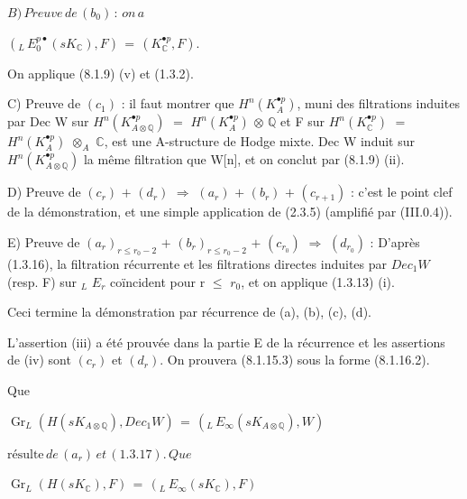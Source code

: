 \documentclass[11pt,twoside]{article}
\newcommand{\DFormula}[1]{%
  \par\smallskip\noindent\hspace*{0pt}\(\displaystyle #1\)\par\smallskip
}
\begin{document}
\DFormula{B)\,Preuve\,de\,(b_{0})\,:\,on\,a}
\par\medskip
\DFormula{(_{L}\,E_{0}^{p\bullet }(sK_{\mathbb{C}}),F)\,=\,(K_{\mathbb{C}}^{\bullet p},F).}
\par\medskip
On applique (8.1.9) (v) et (1.3.2).\par
\par\medskip
C) Preuve de \((c_{1})\) : il faut montrer que \(H^{n}(K_{A}^{\bullet p})\), muni des filtrations induites par Dec W sur \(H^{n}(K_{A\otimes \mathbb{Q}}^{\bullet p})\) \(=\) \(H^{n}(K_{A}^{\bullet p})\) \(\otimes \) \(\mathbb{Q}\) et F sur \(H^{n}(K_{\mathbb{C}}^{\bullet p})\) \(=\) \(H^{n}(K_{A}^{\bullet p})\) \(\otimes _{A}\) \(\mathbb{C}\), est une A-structure de Hodge mixte. Dec W induit sur \(H^{n}(K_{A\otimes \mathbb{Q}}^{\bullet p})\) la même filtration que W[n], et on conclut par (8.1.9) (ii).\par
\par\medskip
D) Preuve de \((c_{r})\) \(+\) \((d_{r})\) \(\Rightarrow \) \((a_{r})\) \(+\) \((b_{r})\) \(+\) \((c_{r+1})\) : c’est le point clef de la démonstration, et une simple application de (2.3.5) (amplifié par (III.0.4)).\par
\par\medskip
E) Preuve de \((a_{r})_{r\leq r_{0}−2}\) \(+\) \((b_{r})_{r\leq r_{0}−2}\) \(+\) \((c_{r_{0}})\) \(\Rightarrow \) \((d_{r_{0}})\) : D’après (1.3.16), la filtration récurrente et les filtrations directes induites par \(Dec_{1}W\) (resp. F) sur \(_{L}\) \(E_{r}\) coïncident pour r \(\leq \) \(r_{0}\), et on applique (1.3.13) (i).\par
\par\medskip
Ceci termine la démonstration par récurrence de (a), (b), (c), (d).\par
\par\medskip
L’assertion (iii) a été prouvée dans la partie E de la récurrence et les assertions de (iv) sont \((c_{r})\) et \((d_{r})\). On prouvera (8.1.15.3) sous la forme (8.1.16.2).\par
\par\medskip
Que\par
\par\medskip
\DFormula{\operatorname{Gr}_{L}(H(sK_{A\otimes \mathbb{Q}}),Dec_{1}W)\,=\,(_{L}\,E_{\infty }(sK_{A\otimes \mathbb{Q}}),W)}
\par\medskip
\DFormula{\text{résulte}\,de\,(a_{r})\,et\,(1.3.17).\,Que}
\par\medskip
\DFormula{\operatorname{Gr}_{L}(H(sK_{\mathbb{C}}),F)\,=\,(_{L}\,E_{\infty }(sK_{\mathbb{C}}),F)}
\end{document}
